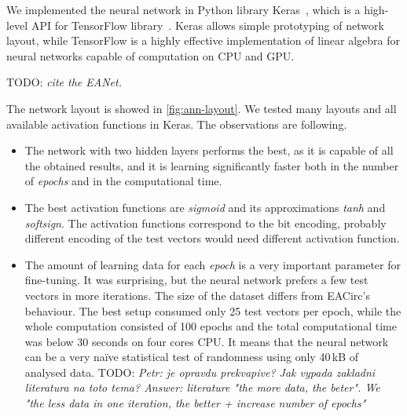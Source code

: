 \documentclass[
  print, %
  Table,   %
  nolof,     %
  nolot,     %
  11pt, %
  oneside  %
]{fithesis3}
\newcommand{\todo}[1]{TODO: \textit{#1}}
\begin{document}
We implemented the neural network in Python library Keras~\cite{chollet2015keras}, which is a high-level API for TensorFlow library~\cite{abadi2016tensorflow}. Keras allows simple prototyping of network layout, while TensorFlow is a highly effective implementation of linear algebra for neural networks capable of computation on CPU and GPU.

\todo{cite the EANet.}

The network layout is showed in \cref{fig:ann-layout}. We tested many layouts and all available activation functions in Keras. The observations are following.

\begin{itemize}
    \item The network with two hidden layers performs the best, as it is capable of all the obtained results, and it is learning significantly faster both in the number of \textit{epochs} and in the computational time.
    \item The best activation functions are \textit{sigmoid} and its approximations \textit{tanh} and \textit{softsign}. The activation functions correspond to the bit encoding, probably different encoding of the test vectors would need different activation function.
    \item The amount of learning data for each \textit{epoch} is a very important parameter for fine-tuning. It was surprising, but the neural network prefers a few test vectors in more iterations. The size of the dataset differs from EACirc's behaviour. The best setup consumed only 25 test vectors per epoch, while the whole computation consisted of 100 epochs and the total computational time was below 30 seconds on four cores CPU. It means that the neural network can be a very naïve statistical test of randomness using only 40\,kB of analysed data. \todo{Petr: je opravdu prekvapive? Jak vypada zakladni literatura na toto tema? Answer: literature "the more data, the beter". We "the less data in one iteration, the better + increase number of epochs"}
\end{itemize}
\end{document}
